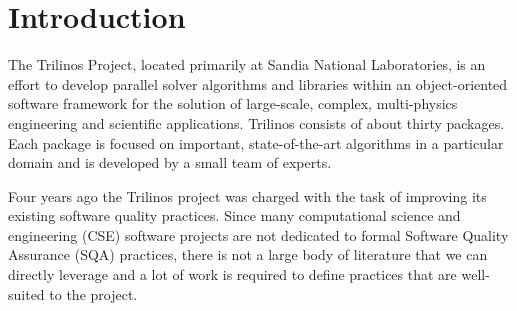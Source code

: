 \documentclass{doublecol}
\begin{document}




\maketitle

\section{Introduction}
\label{Section:Introduction}


The Trilinos Project, located primarily at Sandia National
Laboratories, is an effort to develop parallel solver algorithms and
libraries within an object-oriented software framework for the
solution of large-scale, complex, multi-physics engineering and
scientific applications.  Trilinos consists of about thirty
packages.  Each package is focused on important, state-of-the-art
algorithms in a particular domain and is developed by a small team
of experts.

Four years ago the Trilinos project was charged with the task of
improving its existing software quality practices.  Since many
computational science and engineering (CSE) software projects are
not dedicated to formal Software Quality Assurance (SQA) practices,
there is not a large body of literature that we can directly
leverage and a lot of work is required to define practices that are
well-suited to the project.
\end{document}
